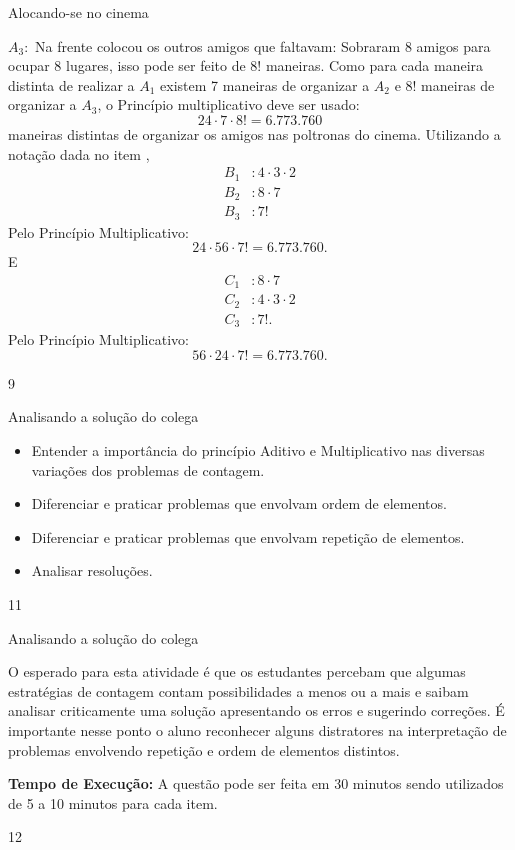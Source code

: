 \begin{answer}{Alocando-se no cinema}
{\begin{enumerate}
$A_3:$ Na frente colocou os outros amigos que faltavam: Sobraram 8 amigos para ocupar 8 lugares, isso pode ser feito de $8!$ maneiras. Como para cada maneira distinta de realizar a $A_1$ existem 7 maneiras de organizar a $A_2$ e $8!$ maneiras de organizar a $A_3$, o Princípio multiplicativo deve ser usado:
$$24 \cdot 7 \cdot 8!= 6.773.760$$
maneiras distintas de organizar os amigos nas poltronas do cinema. 
Utilizando a notação dada no item ,\small
\begin{align*}
B_1&: 4\cdot 3 \cdot 2 \\
B_2&: 8 \cdot 7\\
B_3&: 7!
\end{align*}
Pelo Princípio Multiplicativo: 
$$24\cdot 56 \cdot 7!= 6.773.760.$$ 
E
\begin{align*}
C_1&: 8 \cdot 7\\
C_2&: 4\cdot 3 \cdot 2 \\
C_3&: 7!.
\end{align*}
Pelo Princípio Multiplicativo: 
$$ 56 \cdot 24 \cdot 7!= 6.773.760.$$
\end{enumerate}
}{9}
\end{answer}
\begin{objectives}{Analisando a solução do colega}
{
\begin{itemize}
\item Entender a importância do princípio Aditivo e Multiplicativo nas diversas variações dos problemas de contagem.
\item Diferenciar e praticar problemas que envolvam ordem de elementos. 
\item Diferenciar e praticar problemas que envolvam repetição de elementos. 
\item Analisar resoluções. 
\end{itemize}
}{1}{1}
\end{objectives}
\mspace{-2.25em}
\begin{sugestions}{Analisando a solução do colega}
{
O esperado para esta atividade é que os estudantes percebam que algumas estratégias de contagem contam possibilidades a menos ou a mais e saibam analisar criticamente uma solução apresentando os erros e sugerindo correções. É importante nesse ponto o aluno reconhecer alguns distratores na  interpretação de problemas envolvendo repetição e ordem de elementos distintos.

\textbf{Tempo de Execução:} A questão pode ser feita em 30 minutos sendo utilizados de 5  a 10 minutos para cada item. 
}{1}{2}
\end{sugestions}
